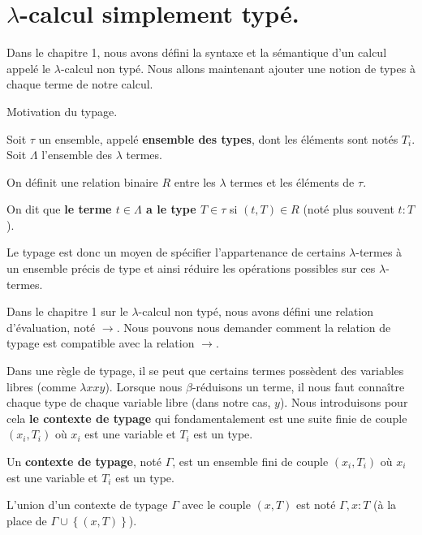 \chapter{$\lambda$-calcul simplement typé.}

Dans le chapitre 1, nous avons défini la syntaxe et la sémantique d'un calcul
appelé le $\lambda$-calcul non typé. Nous allons maintenant ajouter une notion de types à
chaque terme de notre calcul.

Motivation du typage.

\begin{definition} 
  Soit $\tau$ un ensemble, appelé \textbf{ensemble des types}, dont les éléments
  sont notés $T_{i}$.
  Soit $\Lambda$ l'ensemble des $\lambda$ termes.

  On définit une relation binaire $R$ entre les
  $\lambda$ termes et les éléments de $\tau$.
  
  On dit que \textbf{le terme $t \in \Lambda$ a le type $T \in \tau$} si $(t, T)
  \in R$ (noté plus souvent $t : T$).
\end{definition}

Le typage est donc un moyen de spécifier l'appartenance de certains
$\lambda$-termes à un ensemble précis de type et ainsi réduire les opérations
possibles sur ces $\lambda$-termes.

Dans le chapitre 1 sur le $\lambda$-calcul non typé, nous avons défini une
relation d'évaluation, noté $\rightarrow$. Nous pouvons nous demander comment la
relation de typage est compatible avec la relation $\rightarrow$.

Dans une règle de typage, il se peut que certains termes possèdent des variables
libres (comme $\lambda x x y$). Lorsque nous $\beta$-réduisons un terme, il nous
faut connaître chaque type de chaque variable libre (dans notre cas, $y$). Nous
introduisons pour cela \textbf{le contexte de typage} qui fondamentalement est
une suite finie de couple $(x_{i}, T_{i})$ où $x_{i}$ est une variable et
$T_{i}$ est un type.

\begin{definition} 
  Un \textbf{contexte de typage}, noté $\Gamma$, est un ensemble fini de couple $(x_{i},
  T_{i})$ où $x_{i}$ est une variable et $T_{i}$ est un type.
  
  L'union d'un contexte de typage $\Gamma$ avec le couple $(x, T)$ est noté
  $\Gamma, x : T$ (à la place de $\Gamma \cup \left\{(x, T)\right\}$).
\end{definition}

